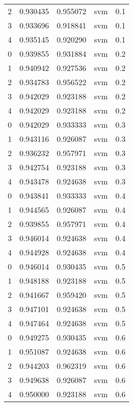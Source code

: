 \begin{tabular}{rrrlr}
     2 & 0.930435 & 0.955072 &      svm &        0.1 \\
     3 & 0.933696 & 0.918841 &      svm &        0.1 \\
     4 & 0.935145 & 0.920290 &      svm &        0.1 \\
     0 & 0.939855 & 0.931884 &      svm &        0.2 \\
     1 & 0.940942 & 0.927536 &      svm &        0.2 \\
     2 & 0.934783 & 0.956522 &      svm &        0.2 \\
     3 & 0.942029 & 0.923188 &      svm &        0.2 \\
     4 & 0.942029 & 0.923188 &      svm &        0.2 \\
     0 & 0.942029 & 0.933333 &      svm &        0.3 \\
     1 & 0.943116 & 0.926087 &      svm &        0.3 \\
     2 & 0.936232 & 0.957971 &      svm &        0.3 \\
     3 & 0.942754 & 0.923188 &      svm &        0.3 \\
     4 & 0.943478 & 0.924638 &      svm &        0.3 \\
     0 & 0.943841 & 0.933333 &      svm &        0.4 \\
     1 & 0.944565 & 0.926087 &      svm &        0.4 \\
     2 & 0.939855 & 0.957971 &      svm &        0.4 \\
     3 & 0.946014 & 0.924638 &      svm &        0.4 \\
     4 & 0.944928 & 0.924638 &      svm &        0.4 \\
     0 & 0.946014 & 0.930435 &      svm &        0.5 \\
     1 & 0.948188 & 0.923188 &      svm &        0.5 \\
     2 & 0.941667 & 0.959420 &      svm &        0.5 \\
     3 & 0.947101 & 0.924638 &      svm &        0.5 \\
     4 & 0.947464 & 0.924638 &      svm &        0.5 \\
     0 & 0.949275 & 0.930435 &      svm &        0.6 \\
     1 & 0.951087 & 0.924638 &      svm &        0.6 \\
     2 & 0.944203 & 0.962319 &      svm &        0.6 \\
     3 & 0.949638 & 0.926087 &      svm &        0.6 \\
     4 & 0.950000 & 0.923188 &      svm &        0.6 \\

\end{tabular}
